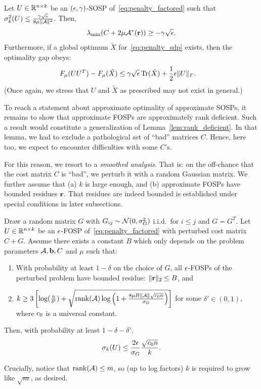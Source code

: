 \begin{lemma}\label{lem:compact_optimal_approx}
	Let $U \in \mathbb{R}^{n\times k}$ be an $(\epsilon, \gamma)$-SOSP of~\eqref{eq:penalty_factored} such that $\sigma_k^2(U) \leq \frac{\gamma \sqrt{\epsilon}}{8 \mu\|\mathcal{A}\|^2}$. Then,
	\begin{align*}
		\lambda_{\min}(C + 2\mu\mathcal{A}^*(\mathbf{r})) \geq -\gamma\sqrt{\epsilon}.
	\end{align*}
	Furthermore, if a global optimum $\tilde X$ for~\eqref{eq:penalty_sdp} exists, then the optimality gap obeys:
	\begin{align*}
		F_\mu(UU^T) - F_\mu(\tilde X) & \leq \gamma \sqrt{\epsilon} \operatorname{Tr}(\tilde X) + \frac{1}{2}\epsilon \|U\|_F.
	\end{align*}
	(Once again, we stress that $U$ and $\tilde X$ as prescribed may not exist in general.)
\end{lemma} 
To reach a statement about approximate optimality of approximate SOSPs, it remains to show that approximate FOSPs are approximately rank deficient. Such a result would constitute a generalization of Lemma~\ref{lem:rank_deficient}. In that lemma, we had to exclude a pathological set of ``bad'' matrices $C$. Hence, here too, we expect to encounter difficulties with some $C$'s.

For this reason, we resort to a \emph{smoothed analysis}. That is: on the off-chance that the cost matrix $C$ is ``bad'', we perturb it with a random Gaussian matrix. We further assume that (a) $k$ is large enough, and (b) approximate FOSPs have bounded residues $\mathbf{r}$. That residues are indeed bounded is established under special conditions in later subsections.
\begin{theorem}\label{thm:compact_eps_fosp}
	Draw a random matrix $G$ with $G_{ij} \sim \mathcal{N}(0, \sigma_G^2)$ i.i.d.\ for $i \leq j$ and $G = G^T$. Let $U \in \mathbb{R}^{n\times k}$ be an $\epsilon$-FOSP of~\eqref{eq:penalty_factored} with perturbed cost matrix $C+G$. Assume there exists a constant $B$ which only depends on the problem parameters $\mathcal{A}, \mathbf{b}, C$ and $\mu$ such that:
	\begin{enumerate}
		\item With probability at least $1-\delta$ on the choice of $G$, all $\epsilon$-FOSPs of the perturbed problem have bounded residue: $\|\mathbf{r}\|_2  \leq B$, and
		\item $k \geq 3\left[\log(\frac{n}{\delta'}) + \sqrt{ \operatorname{rank}(\mathcal{A})   \log\left( 1 + \frac{8 \mu B\|\mathcal{A}\| \sqrt{c_0  n}}{\sigma_G } \right) }  \right]$ for some $\delta' \in (0, 1)$, where $c_0$ is a universal constant.
	\end{enumerate}
	Then, with probability at least $1 - \delta - \delta'$,
	\begin{align*}
	\sigma_k(U) \leq \frac{ 2\epsilon}{\sigma_G } \frac{\sqrt{c_0 n}}{k}.
	\end{align*}
\end{theorem}
Crucially, notice that $\operatorname{rank}(\mathcal{A}) \leq m$, so (up to log factors) $k$ is required to grow like $\sqrt{m}$, as desired.





